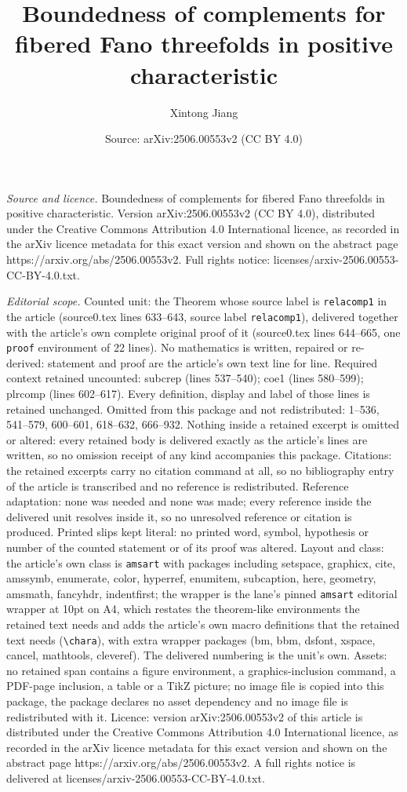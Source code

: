 \documentclass[10pt,a4paper]{amsart}
\title[Boundedness of complements for fibered Fano threefolds in po]{Boundedness of complements for fibered Fano threefolds in positive characteristic}
\author{Xintong Jiang}
\date{Source: arXiv:2506.00553v2 (CC BY 4.0)}
\begin{document}
\maketitle

\noindent\emph{Source and licence.} Boundedness of complements for fibered Fano threefolds in positive characteristic. Version arXiv:2506.00553v2 (CC BY 4.0), distributed under the Creative Commons Attribution 4.0 International licence, as recorded in the arXiv licence metadata for this exact version and shown on the abstract page https://arxiv.org/abs/2506.00553v2. Full rights notice: licenses/arxiv-2506.00553-CC-BY-4.0.txt.\par\smallskip

\noindent\textit{Editorial scope.} Counted unit: the Theorem whose source label is \texttt{relacomp1} in the article (source0.tex lines 633--643, source label \texttt{relacomp1}), delivered together with the article's own complete original proof of it (source0.tex lines 644--665, one \texttt{proof} environment of 22 lines). No mathematics is written, repaired or re-derived: statement and proof are the article's own text line for line. Required context retained uncounted: subcrep (lines 537--540); coe1 (lines 580--599); plrcomp (lines 602--617). Every definition, display and label of those lines is retained unchanged. Omitted from this package and not redistributed: 1--536, 541--579, 600--601, 618--632, 666--932. Nothing inside a retained excerpt is omitted or altered: every retained body is delivered exactly as the article's lines are written, so no omission receipt of any kind accompanies this package. Citations: the retained excerpts carry no citation command at all, so no bibliography entry of the article is transcribed and no reference is redistributed. Reference adaptation: none was needed and none was made; every reference inside the delivered unit resolves inside it, so no unresolved reference or citation is produced. Printed slips kept literal: no printed word, symbol, hypothesis or number of the counted statement or of its proof was altered. Layout and class: the article's own class is \texttt{amsart} with packages including setspace, graphicx, cite, amssymb, enumerate, color, hyperref, enumitem, subcaption, here, geometry, amsmath, fancyhdr, indentfirst; the wrapper is the lane's pinned \texttt{amsart} editorial wrapper at 10pt on A4, which restates the theorem-like environments the retained text needs and adds the article's own macro definitions that the retained text needs (\texttt{\textbackslash chara}), with extra wrapper packages (bm, bbm, dsfont, xspace, cancel, mathtools, cleveref). The delivered numbering is the unit's own. Assets: no retained span contains a figure environment, a graphics-inclusion command, a PDF-page inclusion, a table or a TikZ picture; no image file is copied into this package, the package declares no asset dependency and no image file is redistributed with it. Licence: version arXiv:2506.00553v2 of this article is distributed under the Creative Commons Attribution 4.0 International licence, as recorded in the arXiv licence metadata for this exact version and shown on the abstract page https://arxiv.org/abs/2506.00553v2. A full rights notice is delivered at licenses/arxiv-2506.00553-CC-BY-4.0.txt. 
\end{document}
